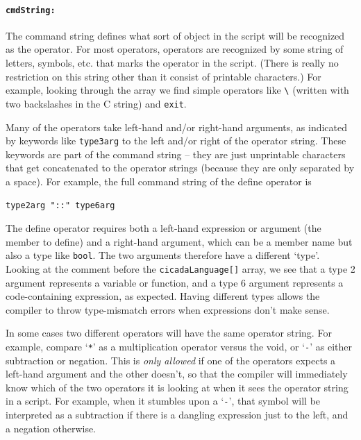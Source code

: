 \documentclass{article}
\newenvironment{code}{
       \begin{list}{}{
               \setlength{\leftmargin}{.4in}
               \setlength{\rightmargin}{0in}
               \setlength{\topsep}{.2in}
       }
       \small
       \item[] }
       { \end{list}   }
\begin{document}
\paragraph{\texttt{cmdString:}}  The command string defines what sort of object in the script will be recognized as the operator.  For most operators, operators are recognized by some string of letters, symbols, etc. that marks the operator in the script.  (There is really no restriction on this string other than it consist of printable characters.)  For example, looking through the array we find simple operators like \verb#\# (written with two backslashes in the C string) and \verb#exit#.

Many of the operators take left-hand and/or right-hand arguments, as indicated by keywords like \verb#type3arg# to the left and/or right of the operator string.  These keywords are part of the command string -- they are just unprintable characters that get concatenated to the operator strings (because they are only separated by a space).  For example, the full command string of the define operator is

\begin{code} \begin{verbatim}
type2arg "::" type6arg
\end{verbatim} \end{code}

\noindent The define operator requires both a left-hand expression or argument (the member to define) and a right-hand argument, which can be a member name but also a type like \verb#bool#.  The two arguments therefore have a different `type'.  Looking at the comment before the \verb#cicadaLanguage[]# array, we see that a type 2 argument represents a variable or function, and a type 6 argument represents a code-containing expression, as expected.  Having different types allows the compiler to throw type-mismatch errors when expressions don't make sense.

In some cases two different operators will have the same operator string.  For example, compare `\verb#*#' as a multiplication operator versus the void, or `\verb#-#' as either subtraction or negation.  This is \emph{only allowed} if one of the operators expects a left-hand argument and the other doesn't, so that the compiler will immediately know which of the two operators it is looking at when it sees the operator string in a script.  For example, when it stumbles upon a `\verb#-#', that symbol will be interpreted as a subtraction if there is a dangling expression just to the left, and a negation otherwise.
\end{document}
